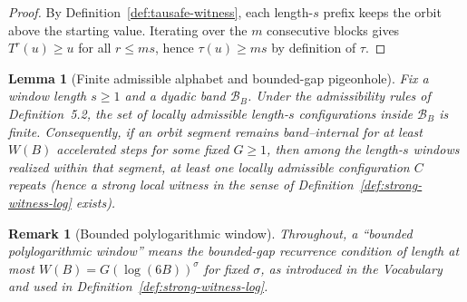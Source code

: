\documentclass[preprint,12pt]{elsarticle}
\newtheorem{remark}{Remark}
\newtheorem{lemma}{Lemma}
\begin{document}
\begin{proof}
By Definition~\ref{def:tausafe-witness}, each length-$s$ prefix keeps the orbit above the
starting value. Iterating over the $m$ consecutive blocks gives $T^r(u)\ge u$ for all
$r\le ms$, hence $\tau(u)\ge ms$ by definition of $\tau$.
\end{proof}


\begin{lemma}[Finite admissible alphabet and bounded-gap pigeonhole]
\label{lem:finite_alphabet_bounded_gap}
Fix a window length $s\ge 1$ and a dyadic band $\mathcal{B}_B$.
Under the admissibility rules of Definition~5.2, the set of locally admissible length-$s$ configurations
inside $\mathcal{B}_B$ is finite.
Consequently, if an orbit segment remains band--internal for at least $W(B)$ accelerated steps
for some fixed $G\ge 1$, then among the length-$s$ windows realized within that segment,
at least one locally admissible configuration $C$ repeats (hence a strong local witness in the sense of
Definition~\ref{def:strong-witness-log} exists).
\end{lemma}

\begin{remark}[Bounded polylogarithmic window]
\label{rem:bounded_log_window_meaning}
Throughout, a ``bounded polylogarithmic window'' means the bounded-gap recurrence condition
of length at most $W(B)=G(\log(6B))^{\sigma}$ for fixed $\sigma$, as introduced in the
Vocabulary and used in Definition~\ref{def:strong-witness-log}.
\end{remark}
\end{document}
